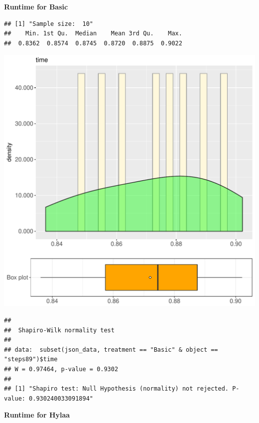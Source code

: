 \documentclass{article}\usepackage[]{graphicx}\usepackage[]{color}
\makeatletter
\def\maxwidth{ %
  \ifdim\Gin@nat@width>\linewidth
    \linewidth
  \else
    \Gin@nat@width
  \fi
}
\newenvironment{kframe}{%
 \def\at@end@of@kframe{}%
 \ifinner\ifhmode%
  \def\at@end@of@kframe{\end{minipage}}%
  \begin{minipage}{\columnwidth}%
 \fi\fi%
 \def\FrameCommand##1{\hskip\@totalleftmargin \hskip-\fboxsep
 \colorbox{shadecolor}{##1}\hskip-\fboxsep
     \hskip-\linewidth \hskip-\@totalleftmargin \hskip\columnwidth}%
 \MakeFramed {\advance\hsize-\width
   \@totalleftmargin\z@ \linewidth\hsize
   \@setminipage}}%
 {\par\unskip\endMakeFramed%
 \at@end@of@kframe}
\newenvironment{knitrout}{}{} %
\makeatother
\begin{document}
 \textbf{Runtime for Basic}
\begin{knitrout}
\color{fgcolor}\begin{kframe}
\begin{verbatim}
## [1] "Sample size:  10"
##    Min. 1st Qu.  Median    Mean 3rd Qu.    Max. 
##  0.8362  0.8574  0.8745  0.8720  0.8875  0.9022
\end{verbatim}
\end{kframe}
\includegraphics[width=\maxwidth]{figure/RH3_Basic_steps89-1} 
\begin{kframe}\begin{verbatim}
## 
## 	Shapiro-Wilk normality test
## 
## data:  subset(json_data, treatment == "Basic" & object == "steps89")$time
## W = 0.97464, p-value = 0.9302
## 
## [1] "Shapiro test: Null Hypothesis (normality) not rejected. P-value: 0.930240033091894"
\end{verbatim}
\end{kframe}
\end{knitrout}
 \textbf{Runtime for Hylaa}
\end{document}

